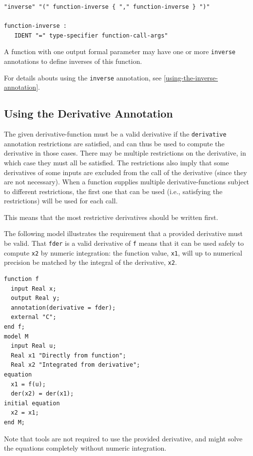 \begin{annotationdefinition}[inverse]
\begin{synopsis}[grammar]\begin{lstlisting}
"inverse" "(" function-inverse { "," function-inverse } ")"

function-inverse :
   IDENT "=" type-specifier function-call-args"
\end{lstlisting}\end{synopsis}
\begin{semantics}
A function with one output formal parameter may have one or more {\lstinline!inverse!} annotations to define inverses of this function.

For details abouts using the {\lstinline!inverse!} annotation, see \cref{using-the-inverse-annotation}.
\end{semantics}
\end{annotationdefinition}


\subsection{Using the Derivative Annotation}\label{using-the-derivative-annotation}

The given derivative-function must be a valid derivative if the {\lstinline!derivative!} annotation restrictions are satisfied, and can thus be used to compute the derivative in those cases.
There may be multiple restrictions on the derivative, in which case they must all be satisfied.
The restrictions also imply that some derivatives of some inputs are excluded from the call of the derivative (since they are not necessary).
When a function supplies multiple derivative-functions subject to different restrictions, the first one that can be used (i.e., satisfying the restrictions) will be used for each call.

\begin{nonnormative}
This means that the most restrictive derivatives should be written first.
\end{nonnormative}

\begin{example}
The following model illustrates the requirement that a provided derivative must be valid.
That {\lstinline!fder!} is a valid derivative of {\lstinline!f!} means that it can be used safely to compute {\lstinline!x2!} by numeric integration: the function value, {\lstinline!x1!}, will up to numerical precision be matched by the integral of the derivative, {\lstinline!x2!}.
\begin{lstlisting}[language=modelica]
function f
  input Real x;
  output Real y;
  annotation(derivative = fder);
  external "C";
end f;
model M
  input Real u;
  Real x1 "Directly from function";
  Real x2 "Integrated from derivative";
equation
  x1 = f(u);
  der(x2) = der(x1);
initial equation
  x2 = x1;
end M;
\end{lstlisting}
Note that tools are not required to use the provided derivative, and might solve the equations completely without numeric integration.
\end{example}

